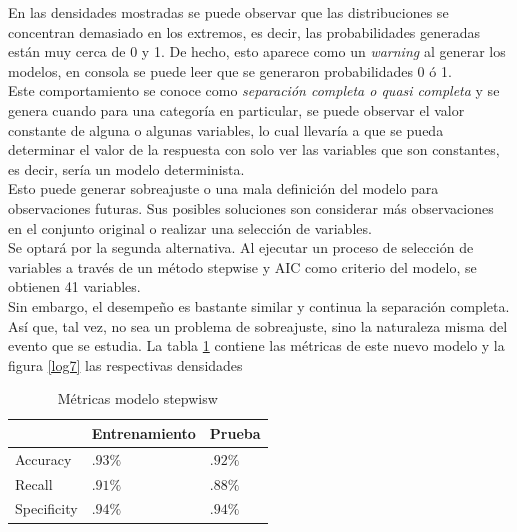 \documentclass[12pt, letterpaper]{article}
\begin{document}
En las densidades mostradas se puede observar que las distribuciones se concentran demasiado en los extremos, es decir, las probabilidades generadas están muy cerca de 0 y 1. De hecho, esto aparece como un \emph{warning} al generar los modelos, en consola se puede leer que se generaron probabilidades 0 ó 1.\\

Este comportamiento se conoce como \emph{separación completa o quasi completa} y se genera cuando para una categoría en particular, se puede observar el valor constante de alguna o algunas variables, lo cual llevaría a que se pueda determinar el valor de la respuesta con solo ver las variables que son constantes, es decir, sería un modelo determinista.\\

Esto puede generar sobreajuste o una mala definición del modelo para observaciones futuras. Sus posibles soluciones son considerar más observaciones en el conjunto original o realizar una selección de variables.\\

Se optará por la segunda alternativa. Al ejecutar un proceso de selección de variables a través de un método stepwise y AIC como criterio del modelo, se obtienen 41 variables.\\

Sin embargo, el desempeño es bastante similar y continua la separación completa. Así que, tal vez, no sea un problema de sobreajuste, sino la naturaleza misma del evento que se estudia. La tabla \ref{log6} contiene las métricas de este nuevo modelo y la figura \ref{log7} las respectivas densidades


\begin{table}[ht]
\centering
\begin{tabular}{|l|l|l|}
\hline
&Entrenamiento&Prueba\\
\hline\hline
Accuracy& $.93\%$ & $.92 \%$ \\ \hline
Recall & $.91\%$ & $.88 \%$ \\ \hline
Specificity & $.94\%$ & $.94 \%$ \\ \hline
\end{tabular}
\caption{Métricas modelo stepwisw}
\label{log6}
\end{table}
\end{document}
